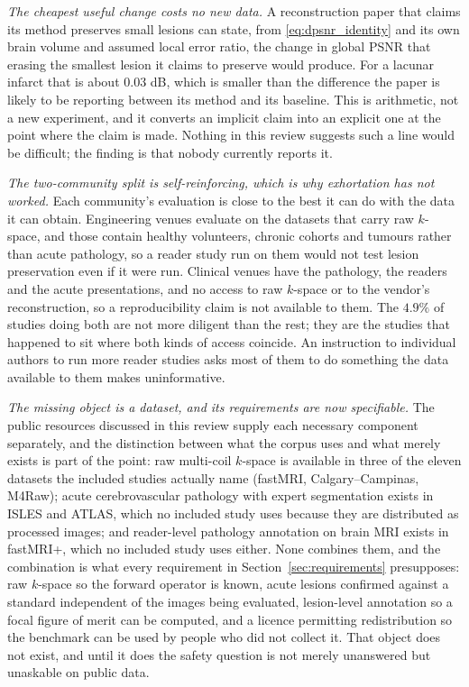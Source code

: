 \documentclass[review,authoryear]{elsarticle}
\begin{document}
\emph{The cheapest useful change costs no new data.} A reconstruction paper that claims
its method preserves small lesions can state, from \eqref{eq:dpsnr_identity} and its own
brain volume and assumed local error ratio, the change in global PSNR that erasing the
smallest lesion it claims to preserve would produce. For a lacunar infarct that is about
$0.03$ dB, which is smaller than the difference the paper is likely to be reporting
between its method and its baseline. This is arithmetic, not a new experiment, and it
converts an implicit claim into an explicit one at the point where the claim is made.
Nothing in this review suggests such a line would be difficult; the finding is that
nobody currently reports it.

\emph{The two-community split is self-reinforcing, which is why exhortation has not
worked.} Each community's evaluation is close to the best it can do with the data it can
obtain. Engineering venues evaluate on the datasets that carry raw $k$-space, and those
contain healthy volunteers, chronic cohorts and tumours rather than acute pathology, so
a reader study run on them would not test lesion preservation even if it were run.
Clinical venues have the pathology, the readers and the acute presentations, and no
access to raw $k$-space or to the vendor's reconstruction, so a reproducibility claim is
not available to them. The $4.9\%$ of studies doing both are not more diligent than the
rest; they are the studies that happened to sit where both kinds of access coincide. An
instruction to individual authors to run more reader studies asks most of them to do
something the data available to them makes uninformative.

\emph{The missing object is a dataset, and its requirements are now specifiable.} The
public resources discussed in this review supply each necessary component separately, and
the distinction between what the corpus uses and what merely exists is part of the point:
raw multi-coil $k$-space is available in three of the eleven datasets the included studies
actually name (fastMRI, Calgary--Campinas, M4Raw); acute cerebrovascular pathology with
expert segmentation exists in ISLES and ATLAS, which no included study uses because they
are distributed as processed images; and reader-level pathology annotation on brain MRI
exists in fastMRI+, which no included study uses either. None combines them, and the combination is what
every requirement in Section~\ref{sec:requirements} presupposes: raw $k$-space so the
forward operator is known, acute lesions confirmed against a standard independent of the
images being evaluated, lesion-level annotation so a focal figure of merit can be
computed, and a licence permitting redistribution so the benchmark can be used by people
who did not collect it. That object does not exist, and until it does the safety
question is not merely unanswered but unaskable on public data.
\end{document}

